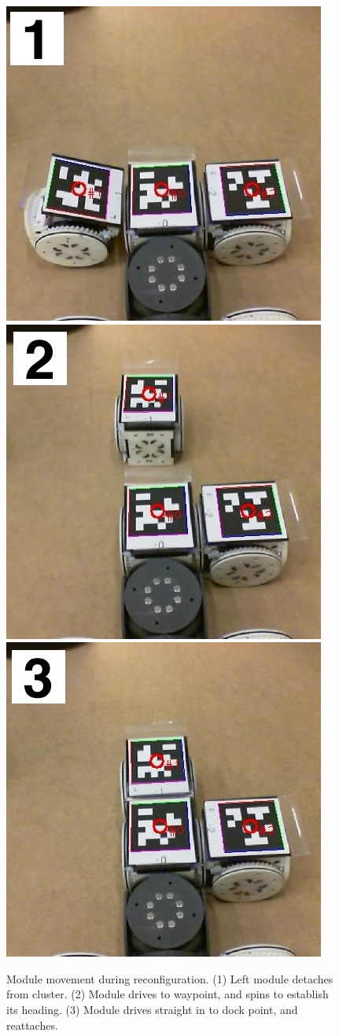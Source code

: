 \documentclass[journal]{IEEEtran}
\begin{document}
\begin{figure}[t]
\begin{center}
  \includegraphics[width=0.32\columnwidth]{images/reconf_detach.jpg}
  \includegraphics[width=0.32\columnwidth]{images/reconf_waypoint.jpg}
  \includegraphics[width=0.32\columnwidth]{images/reconf_attach.jpg}
  \caption{Module movement during reconfiguration. (1) Left module detaches from cluster. (2) Module drives to waypoint, and spins to establish its heading. (3) Module drives straight in to dock point, and reattaches.}
  \label{fig:reconf}
  \vspace{-3em}
\end{center}
\end{figure}

\end{document}
